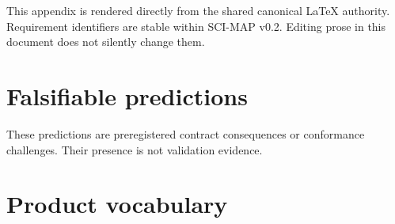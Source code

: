 \documentclass[10pt]{article}
\begin{document}
This appendix is rendered directly from the shared canonical LaTeX authority.
Requirement identifiers are stable within SCI-MAP v0.2. Editing prose in this
document does not silently change them.

\renewcommand{\SCIMapRequirement}[4]{%
  \phantomsection\label{req:#1}%
  \noindent\textbf{\textcolor{MapNavy}{#1} -- #2.} #3\par\smallskip}
\begin{sloppypar}
\SCIMapRequirements
\end{sloppypar}

\clearpage
\section{Falsifiable predictions}\label{app:predictions}

These predictions are preregistered contract consequences or conformance
challenges. Their presence is not validation evidence.

\renewcommand{\SCIMapPrediction}[4]{%
  \phantomsection\label{pred:#1}%
  \noindent\textbf{\textcolor{MapNavy}{#1} -- #2.} #3
  \textit{Primary claim layer: #4.}\par\smallskip}
\SCIMapPredictions

\clearpage
\section{Product vocabulary}
\end{document}
